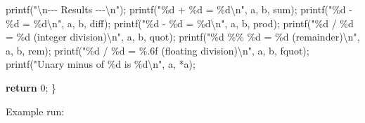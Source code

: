 \documentclass[
  letterpaper,
  DIV=11,
  numbers=noendperiod]{scrreprt}
\newenvironment{Shaded}{\begin{snugshade}}{\end{snugshade}}
\newcommand{\ControlFlowTok}[1]{\textcolor[rgb]{0.00,0.23,0.31}{\textbf{#1}}}
\newcommand{\DecValTok}[1]{\textcolor[rgb]{0.68,0.00,0.00}{#1}}
\newcommand{\NormalTok}[1]{\textcolor[rgb]{0.00,0.23,0.31}{#1}}
\newcommand{\OperatorTok}[1]{\textcolor[rgb]{0.37,0.37,0.37}{#1}}
\newcommand{\SpecialCharTok}[1]{\textcolor[rgb]{0.37,0.37,0.37}{#1}}
\newcommand{\StringTok}[1]{\textcolor[rgb]{0.13,0.47,0.30}{#1}}
\begin{document}
\begin{Shaded}
\begin{Highlighting}[]
\NormalTok{    printf}\OperatorTok{(}\StringTok{"}\SpecialCharTok{\textbackslash{}n}\StringTok{{-}{-}{-} Results {-}{-}{-}}\SpecialCharTok{\textbackslash{}n}\StringTok{"}\OperatorTok{);}
\NormalTok{    printf}\OperatorTok{(}\StringTok{"}\SpecialCharTok{\%d}\StringTok{ + }\SpecialCharTok{\%d}\StringTok{ = }\SpecialCharTok{\%d\textbackslash{}n}\StringTok{"}\OperatorTok{,}\NormalTok{ a}\OperatorTok{,}\NormalTok{ b}\OperatorTok{,}\NormalTok{ sum}\OperatorTok{);}
\NormalTok{    printf}\OperatorTok{(}\StringTok{"}\SpecialCharTok{\%d}\StringTok{ {-} }\SpecialCharTok{\%d}\StringTok{ = }\SpecialCharTok{\%d\textbackslash{}n}\StringTok{"}\OperatorTok{,}\NormalTok{ a}\OperatorTok{,}\NormalTok{ b}\OperatorTok{,}\NormalTok{ diff}\OperatorTok{);}
\NormalTok{    printf}\OperatorTok{(}\StringTok{"}\SpecialCharTok{\%d}\StringTok{ {-} }\SpecialCharTok{\%d}\StringTok{ = }\SpecialCharTok{\%d\textbackslash{}n}\StringTok{"}\OperatorTok{,}\NormalTok{ a}\OperatorTok{,}\NormalTok{ b}\OperatorTok{,}\NormalTok{ prod}\OperatorTok{);}
\NormalTok{    printf}\OperatorTok{(}\StringTok{"}\SpecialCharTok{\%d}\StringTok{ / }\SpecialCharTok{\%d}\StringTok{ = }\SpecialCharTok{\%d}\StringTok{ (integer division)}\SpecialCharTok{\textbackslash{}n}\StringTok{"}\OperatorTok{,}\NormalTok{ a}\OperatorTok{,}\NormalTok{ b}\OperatorTok{,}\NormalTok{ quot}\OperatorTok{);}
\NormalTok{    printf}\OperatorTok{(}\StringTok{"}\SpecialCharTok{\%d}\StringTok{ }\SpecialCharTok{\%\%}\StringTok{ }\SpecialCharTok{\%d}\StringTok{ = }\SpecialCharTok{\%d}\StringTok{ (remainder)}\SpecialCharTok{\textbackslash{}n}\StringTok{"}\OperatorTok{,}\NormalTok{ a}\OperatorTok{,}\NormalTok{ b}\OperatorTok{,}\NormalTok{ rem}\OperatorTok{);}
\NormalTok{    printf}\OperatorTok{(}\StringTok{"}\SpecialCharTok{\%d}\StringTok{ / }\SpecialCharTok{\%d}\StringTok{ = }\SpecialCharTok{\%.6f}\StringTok{ (floating division)}\SpecialCharTok{\textbackslash{}n}\StringTok{"}\OperatorTok{,}\NormalTok{ a}\OperatorTok{,}\NormalTok{ b}\OperatorTok{,}\NormalTok{ fquot}\OperatorTok{);}
\NormalTok{    printf}\OperatorTok{(}\StringTok{"Unary minus of }\SpecialCharTok{\%d}\StringTok{ is }\SpecialCharTok{\%d\textbackslash{}n}\StringTok{"}\OperatorTok{,}\NormalTok{ a}\OperatorTok{,} \OperatorTok{*}\NormalTok{a}\OperatorTok{);}

    \ControlFlowTok{return} \DecValTok{0}\OperatorTok{;}
\OperatorTok{\}}
\end{Highlighting}
\end{Shaded}

Example run:
\end{document}
